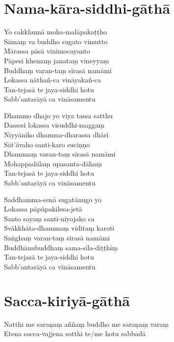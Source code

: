 \enlargethispage{\baselineskip}

\section{Nama-kāra-siddhi-gāthā}


\begin{paritta}
Yo cakkhumā moha-malāpakaṭṭho\\
Sāmaṃ va buddho sugato vimutto\\
Mārassa pāsā vinimocayanto\\
Pāpesi khemaṃ janataṃ vineyyaṃ\\
Buddhaṃ varan-taṃ sirasā namāmi\\
Lokassa nāthañ-ca vināyakañ-ca\\
Tan-tejasā te jaya-siddhi hotu\\
Sabb'antarāyā ca vināsamentu

Dhammo dhajo yo viya tassa satthu\\
Dassesi lokassa visuddhi-maggaṃ\\
Niyyāniko dhamma-dharassa dhārī\\
Sāt'āvaho santi-karo suciṇṇo\\
Dhammaṃ varan-taṃ sirasā namāmi\\
Mohappadālaṃ upasanta-dāhaṃ\\
Tan-tejasā te jaya-siddhi hotu\\
Sabb'antarāyā ca vināsamentu

Saddhamma-senā sugatānugo yo\\
Lokassa pāpūpakilesa-jetā\\
Santo sayaṃ santi-niyojako ca\\
Svākkhāta-dhammaṃ viditaṃ karoti\\
Saṅghaṃ varan-taṃ sirasā namāmi\\
Buddhānubuddhaṃ sama-sīla-diṭṭhiṃ\\
Tan-tejasā te jaya-siddhi hotu\\
Sabb'antarāyā ca vināsamentu 
\end{paritta}

\section{Sacca-kiriyā-gāthā}


Natthi me saraṇaṃ aññaṃ buddho me saraṇaṃ varaṃ\\
Etena sacca-vajjena sotthi te/me hotu sabbadā

